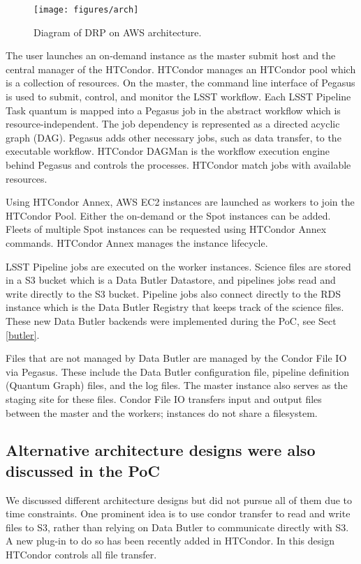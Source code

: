 \begin{figure}
  \centering
  \texttt{[image: figures/arch]}
  \label{fig:arch}
  \caption{Diagram of DRP on AWS architecture.}
\end{figure}

The user launches an on-demand instance as the master submit host and the central manager of the HTCondor.
HTCondor manages an HTCondor pool which is a collection of resources.
On the master, the command line interface of Pegasus is used to submit, control, and monitor the LSST workflow.
Each LSST Pipeline Task quantum is mapped into a Pegasus job in the abstract workflow which is resource-independent.
The job dependency is represented as a directed acyclic graph (DAG).
Pegasus adds other necessary jobs, such as data transfer, to the executable workflow.
HTCondor DAGMan is the workflow execution engine behind Pegasus and controls the processes.
HTCondor match jobs with available resources.

Using HTCondor Annex, AWS EC2 instances are launched as workers to join the HTCondor Pool.
Either the on-demand or the Spot instances can be added.
Fleets of multiple Spot instances can be requested using HTCondor Annex commands.
HTCondor Annex manages the instance lifecycle.

LSST Pipeline jobs are executed on the worker instances.
Science files are stored in a S3 bucket which is a Data Butler Datastore, and pipelines jobs read and write directly to the S3 bucket.
Pipeline jobs also connect directly to the RDS instance which is the Data Butler Registry that keeps track of the science files.
These new Data Butler backends were implemented during the PoC, see Sect \ref{butler}.

Files that are not managed by Data Butler are managed by the Condor File IO via Pegasus.
These include the Data Butler configuration file, pipeline definition (Quantum Graph) files, and the log files.
The master instance also serves as the staging site for these files.
Condor File IO transfers input and output files between the master and the workers; instances do not share a filesystem.


\subsection{Alternative architecture designs were also discussed in the PoC}

We discussed different architecture designs but did not pursue all of them due to time constraints.
One prominent idea is to use condor transfer to read and write files to S3, rather than relying on Data Butler to communicate directly with S3.
A new plug-in to do so has been recently added in HTCondor.
In this design HTCondor controls all file transfer.

